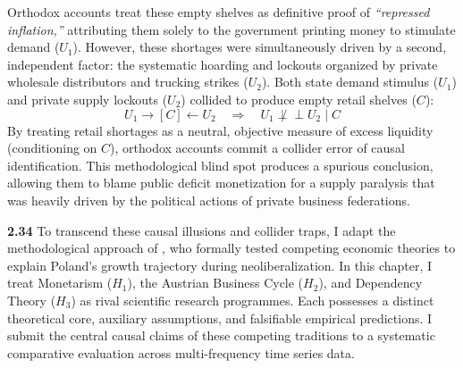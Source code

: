 Orthodox accounts treat these empty shelves as definitive proof of \textit{``repressed inflation,''} attributing them solely to the government printing money to stimulate demand ($U_1$). However, these shortages were simultaneously driven by a second, independent factor: the systematic hoarding and lockouts organized by private wholesale distributors and trucking strikes ($U_2$). Both state demand stimulus ($U_1$) and private supply lockouts ($U_2$) collided to produce empty retail shelves ($C$):
\begin{equation}
	U_1 \longrightarrow [C] \longleftarrow U_2 \quad \Longrightarrow \quad U_1 \not\perp\!\!\!\perp U_2 \mid C
\end{equation}
By treating retail shortages as a neutral, objective measure of excess liquidity (conditioning on $C$), orthodox accounts commit a collider error of causal identification. This methodological blind spot produces a spurious conclusion, allowing them to blame public deficit monetization for a supply paralysis that was heavily driven by the political actions of private business federations.

\textbf{2.34} To transcend these causal illusions and collider traps, I adapt the methodological approach of \citet{KingSznajder2006}, who formally tested competing economic theories to explain Poland's growth trajectory during neoliberalization. In this chapter, I treat Monetarism ($H_1$), the Austrian Business Cycle ($H_2$), and Dependency Theory ($H_3$) as rival scientific research programmes. Each possesses a distinct theoretical core, auxiliary assumptions, and falsifiable empirical predictions. I submit the central causal claims of these competing traditions to a systematic comparative evaluation across multi-frequency time series data.
